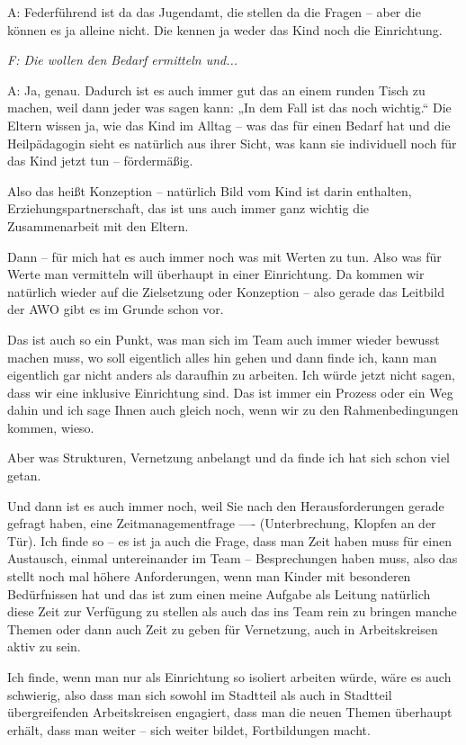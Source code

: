 \begin{linenumbers*}
A: Federführend ist da das Jugendamt, die stellen da die Fragen -- aber die können es ja alleine nicht. Die kennen ja weder das Kind noch die Einrichtung. 

\emph{F: Die wollen den Bedarf ermitteln und...}

A: Ja, genau. Dadurch ist es auch immer gut das an einem runden Tisch zu machen, weil dann jeder was sagen kann: „In dem Fall ist das noch wichtig.“ Die Eltern wissen ja, wie das Kind im Alltag -- was das für einen Bedarf hat und die Heilpädagogin sieht es natürlich aus ihrer Sicht, was kann sie individuell noch für das Kind jetzt tun -- fördermäßig. 

Also das heißt Konzeption -- natürlich Bild vom Kind ist darin enthalten, Erziehungspartnerschaft, das ist uns auch immer ganz wichtig die Zusammenarbeit mit den Eltern. 

Dann -- für mich hat es auch immer noch was mit Werten zu tun. Also was für Werte man vermitteln will überhaupt in einer Einrichtung. Da kommen wir natürlich wieder auf die Zielsetzung oder Konzeption -- also gerade das Leitbild der AWO gibt es im Grunde schon vor. 

Das ist auch so ein Punkt, was man sich im Team auch immer wieder bewusst machen muss, wo soll eigentlich alles hin gehen und dann finde ich, kann man eigentlich gar nicht anders als daraufhin zu arbeiten. 
Ich würde jetzt nicht sagen, dass wir eine inklusive Einrichtung sind. Das ist immer ein Prozess oder ein Weg dahin und ich sage Ihnen auch gleich noch, wenn 
wir zu den Rahmenbedingungen kommen, wieso. 

Aber was Strukturen, Vernetzung anbelangt und da finde ich hat sich schon viel getan. 

Und dann ist es auch immer noch, weil Sie nach den Herausforderungen gerade gefragt haben, eine Zeitmanagementfrage ---- (Unterbrechung, Klopfen an der Tür). Ich finde so -- es ist ja auch die Frage, dass man Zeit haben muss für einen Austausch, einmal untereinander im Team -- Besprechungen haben muss, also das stellt noch mal höhere Anforderungen, wenn man Kinder mit besonderen Bedürfnissen hat und das ist zum einen 
meine Aufgabe als Leitung natürlich diese Zeit zur Verfügung zu stellen als auch das ins Team rein zu bringen manche Themen oder dann auch Zeit zu geben für Vernetzung, auch in Arbeitskreisen aktiv zu sein. 

Ich finde, wenn man nur als Einrichtung so isoliert arbeiten würde, wäre es auch schwierig, also dass man sich sowohl im Stadtteil als auch in Stadtteil übergreifenden Arbeitskreisen engagiert, dass man die neuen Themen überhaupt erhält, dass man weiter -- sich weiter bildet, Fortbildungen macht. 


\end{linenumbers*}

